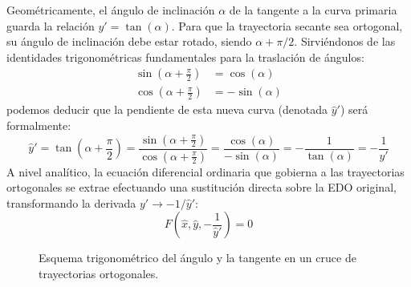\documentclass[11pt,a4paper]{article}
\theoremstyle{definition}
\theoremstyle{plain}
\begin{document}
Geométricamente, el ángulo de inclinación $\alpha$ de la tangente a la curva primaria guarda la relación $y' = \tan(\alpha)$. Para que la trayectoria secante sea ortogonal, su ángulo de inclinación debe estar rotado, siendo $\alpha + \pi/2$. Sirviéndonos de las identidades trigonométricas fundamentales para la traslación de ángulos:
\begin{align*}
    \sin\left(\alpha + \frac{\pi}{2}\right) &= \cos(\alpha) \\
    \cos\left(\alpha + \frac{\pi}{2}\right) &= -\sin(\alpha)
\end{align*}
podemos deducir que la pendiente de esta nueva curva (denotada $\hat{y}'$) será formalmente:
$$ \hat{y}' = \tan\left(\alpha + \frac{\pi}{2}\right) = \frac{\sin\left(\alpha + \frac{\pi}{2}\right)}{\cos\left(\alpha + \frac{\pi}{2}\right)} = \frac{\cos(\alpha)}{-\sin(\alpha)} = -\frac{1}{\tan(\alpha)} = -\frac{1}{y'} $$
A nivel analítico, la ecuación diferencial ordinaria que gobierna a las trayectorias ortogonales se extrae efectuando una sustitución directa sobre la EDO original, transformando la derivada $y' \to -1/\hat{y}'$:
$$ F\left(\hat{x}, \hat{y}, -\frac{1}{\hat{y}'}\right) = 0 $$

\begin{figure}[H]
    \centering
    \caption{Esquema trigonométrico del ángulo y la tangente en un cruce de trayectorias ortogonales.}
\end{figure}
\end{document}
